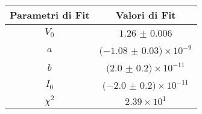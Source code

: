 \begin{tabular}{cc}
\hline
	Parametri di Fit & Valori di Fit\\ 
\hline
	$V_0$ & $1.26$ $\pm$ $0.006$ \\
	$a$ & $(-1.08$ $\pm$ $0.03)\times 10^{-9}$ \\
	$b$ & $(2.0$ $\pm$ $0.2)\times 10^{-11}$ \\
	$I_0$ & $(-2.0$ $\pm$ $0.2)\times 10^{-11}$ \\
	$\chi^2$ & $2.39\times 10^{1}$ \\
\hline
\end{tabular}
